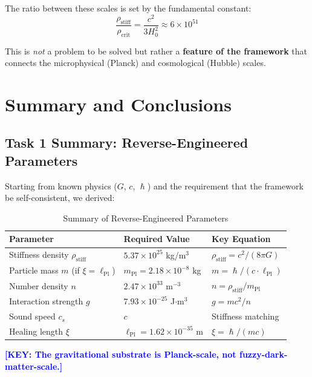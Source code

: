 \documentclass[11pt,a4paper]{article}
\newcommand{\ee}[1]{\times 10^{#1}}
\newcommand{\hbar}{\ensuremath{\hslash}}
\newcommand{\lPl}{\ensuremath{\ell_{\mathrm{Pl}}}}
\newcommand{\mPl}{\ensuremath{m_{\mathrm{Pl}}}}
\newcommand{\rhocrit}{\ensuremath{\rho_{\mathrm{crit}}}}
\newcommand{\rhostiff}{\ensuremath{\rho_{\mathrm{stiff}}}}
\theoremstyle{definition}
\newcommand{\KEY}[1]{\textcolor{blue}{\textbf{[KEY: #1]}}}
\begin{document}
The ratio between these scales is set by the fundamental constant:
\begin{equation}
\frac{\rhostiff}{\rhocrit} = \frac{c^2}{3H_0^2} \approx 6 \times 10^{51}
\end{equation}

This is \emph{not} a problem to be solved but rather a \textbf{feature of the framework} that connects the microphysical (Planck) and cosmological (Hubble) scales.

\section{Summary and Conclusions}
\label{sec:conclusions}

\subsection{Task 1 Summary: Reverse-Engineered Parameters}

Starting from known physics ($G$, $c$, $\hbar$) and the requirement that the framework be self-consistent, we derived:

\begin{table}[H]
\centering
\caption{Summary of Reverse-Engineered Parameters}
\label{tab:summary}
\begin{tabular}{@{}lll@{}}
\toprule
\textbf{Parameter} & \textbf{Required Value} & \textbf{Key Equation} \\
\midrule
Stiffness density $\rhostiff$ & $5.37 \ee{25}$ kg/m$^3$ & $\rhostiff = c^2/(8\pi G)$ \\
Particle mass $m$ (if $\xi = \lPl$) & $\mPl = 2.18 \ee{-8}$ kg & $m = \hbar/(c \cdot \lPl)$ \\
Number density $n$ & $2.47 \ee{33}$ m$^{-3}$ & $n = \rhostiff/\mPl$ \\
Interaction strength $g$ & $7.93 \ee{-25}$ J$\cdot$m$^3$ & $g = mc^2/n$ \\
Sound speed $c_s$ & $c$ & Stiffness matching \\
Healing length $\xi$ & $\lPl = 1.62 \ee{-35}$ m & $\xi = \hbar/(mc)$ \\
\bottomrule
\end{tabular}
\end{table}

\KEY{The gravitational substrate is Planck-scale, not fuzzy-dark-matter-scale.}
\end{document}
